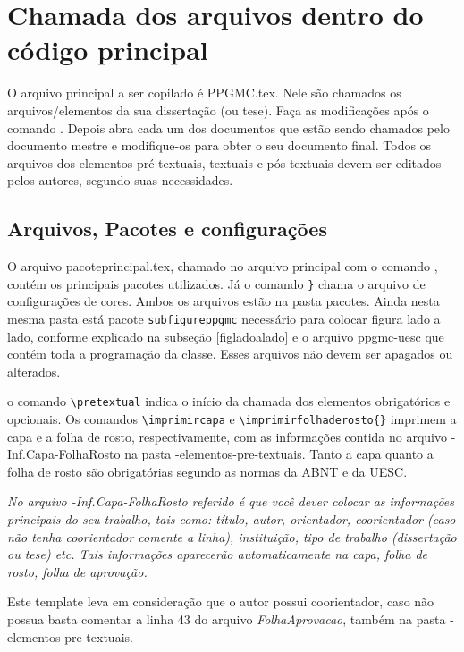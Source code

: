 
\chapter{Chamada dos arquivos dentro do código principal}
O arquivo principal a ser copilado é {\ttfamily PPGMC.tex}. Nele são chamados os  arquivos/elementos da sua dissertação (ou tese). Faça as modificações após o comando \verb##. Depois abra cada um dos documentos que estão sendo chamados pelo documento mestre e modifique-os para obter o seu documento final. Todos os arquivos dos elementos pré-textuais, textuais e pós-textuais devem ser editados pelos autores, segundo suas necessidades.

\section{Arquivos, Pacotes e configurações}
O arquivo {\ttfamily pacoteprincipal.tex}, chamado no arquivo principal com o comando \verb##, contém os principais pacotes utilizados. Já o comando \verb#}# chama o arquivo de configurações de cores. Ambos os arquivos estão na  {\ttfamily pasta pacotes}. Ainda nesta mesma pasta está pacote \verb#subfigureppgmc# necessário para colocar figura lado a lado, conforme explicado na subseção \ref{figladoalado} e o arquivo {\ttfamily ppgmc-uesc} que contém toda a programação da classe. Esses arquivos não devem ser apagados ou alterados.

o comando \verb#\pretextual# indica o início da chamada dos elementos obrigatórios e opcionais. Os comandos  \verb#\imprimircapa# e \verb#\imprimirfolhaderosto{}# imprimem a capa e  a folha de rosto, respectivamente, com as informações contida no arquivo {-Inf.Capa-FolhaRosto} na pasta {-elementos-pre-textuais}. Tanto a capa quanto a folha de rosto são obrigatórias segundo as normas da ABNT e da UESC.

\textit{No arquivo \textit{{-Inf.Capa-FolhaRosto}} referido é que você dever colocar as informações principais do seu trabalho, tais como: título, autor, orientador, coorientador (caso não tenha coorientador comente a linha), instituição, tipo de trabalho (dissertação ou tese) etc. Tais informações aparecerão automaticamente na capa, folha de rosto, folha de aprovação.}

Este template leva em consideração que o autor possui coorientador, caso não possua basta comentar a linha 43 do arquivo \textit{{\ttfamily FolhaAprovacao}}, também na pasta {-elementos-pre-textuais}.


